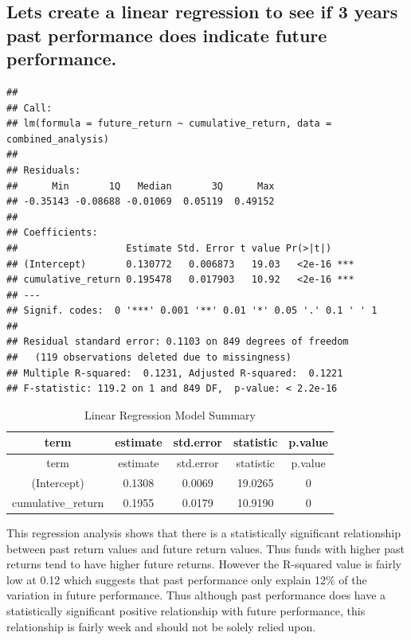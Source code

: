 \documentclass[11pt,preprint, authoryear]{elsarticle}
\numberwithin{equation}{section}
\numberwithin{figure}{section}
\numberwithin{table}{section}
\begin{document}
\hypertarget{lets-create-a-linear-regression-to-see-if-3-years-past-performance-does-indicate-future-performance.}{%
\subsection{Lets create a linear regression to see if 3 years past
performance does indicate future
performance.}\label{lets-create-a-linear-regression-to-see-if-3-years-past-performance-does-indicate-future-performance.}}

\begin{verbatim}
## 
## Call:
## lm(formula = future_return ~ cumulative_return, data = combined_analysis)
## 
## Residuals:
##      Min       1Q   Median       3Q      Max 
## -0.35143 -0.08688 -0.01069  0.05119  0.49152 
## 
## Coefficients:
##                   Estimate Std. Error t value Pr(>|t|)    
## (Intercept)       0.130772   0.006873   19.03   <2e-16 ***
## cumulative_return 0.195478   0.017903   10.92   <2e-16 ***
## ---
## Signif. codes:  0 '***' 0.001 '**' 0.01 '*' 0.05 '.' 0.1 ' ' 1
## 
## Residual standard error: 0.1103 on 849 degrees of freedom
##   (119 observations deleted due to missingness)
## Multiple R-squared:  0.1231, Adjusted R-squared:  0.1221 
## F-statistic: 119.2 on 1 and 849 DF,  p-value: < 2.2e-16
\end{verbatim}

\begin{longtable}[]{@{}ccccc@{}}
\caption{Linear Regression Model Summary}\tabularnewline
\toprule\noalign{}
term & estimate & std.error & statistic & p.value \\
\midrule\noalign{}
\endfirsthead
\toprule\noalign{}
term & estimate & std.error & statistic & p.value \\
\midrule\noalign{}
\endhead
\bottomrule\noalign{}
\endlastfoot
(Intercept) & 0.1308 & 0.0069 & 19.0265 & 0 \\
cumulative\_return & 0.1955 & 0.0179 & 10.9190 & 0 \\
\end{longtable}

This regression analysis shows that there is a statistically significant
relationship between past return values and future return values. Thus
funds with higher past returns tend to have higher future returns.
However the R-squared value is fairly low at 0.12 which suggests that
past performance only explain 12\% of the variation in future
performance. Thus although past performance does have a statistically
significant positive relationship with future performance, this
relationship is fairly week and should not be solely relied upon.
\end{document}
